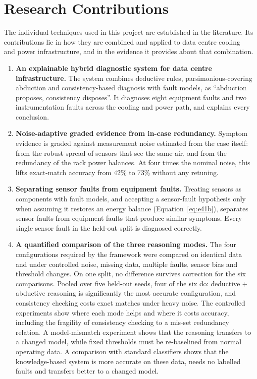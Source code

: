 \section{Research Contributions}
\label{sec:contributions}

The individual techniques used in this project are established in the literature. Its contributions lie in how they are combined and applied to data centre cooling and power infrastructure, and in the evidence it provides about that combination.

\begin{enumerate}
  \item \textbf{An explainable hybrid diagnostic system for data centre infrastructure.} The system combines deductive rules, parsimonious-covering abduction and consistency-based diagnosis with fault models, as ``abduction proposes, consistency disposes''. It diagnoses eight equipment faults and two instrumentation faults across the cooling and power path, and explains every conclusion.
  \item \textbf{Noise-adaptive graded evidence from in-case redundancy.} Symptom evidence is graded against measurement noise estimated from the case itself: from the robust spread of sensors that see the same air, and from the redundancy of the rack power balances. At four times the nominal noise, this lifts exact-match accuracy from 42\% to 73\% without any retuning.
  \item \textbf{Separating sensor faults from equipment faults.} Treating sensors as components with fault models, and accepting a sensor-fault hypothesis only when assuming it restores an energy balance (Equation~\eqref{eq:e41b}), separates sensor faults from equipment faults that produce similar symptoms. Every single sensor fault in the held-out split is diagnosed correctly.
  \item \textbf{A quantified comparison of the three reasoning modes.} The four configurations required by the framework were compared on identical data and under controlled noise, missing data, multiple faults, sensor bias and threshold changes. On one split, no difference survives correction for the six comparisons. Pooled over five held-out seeds, four of the six do: deductive + abductive reasoning is significantly the most accurate configuration, and consistency checking costs exact matches under heavy noise. The controlled experiments show where each mode helps and where it costs accuracy, including the fragility of consistency checking to a mis-set redundancy relation. A model-mismatch experiment shows that the reasoning transfers to a changed model, while fixed thresholds must be re-baselined from normal operating data. A comparison with standard classifiers shows that the knowledge-based system is more accurate on these data, needs no labelled faults and transfers better to a changed model.

\end{enumerate}
